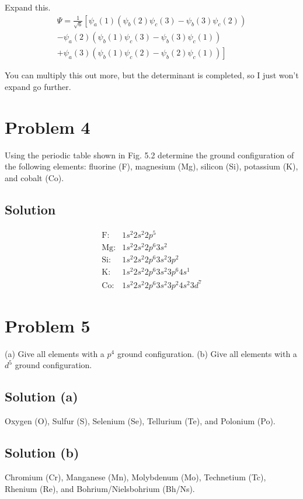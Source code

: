 \documentclass[12pt]{article}
\begin{document}
            Expand this.
            \begin{multline}
                \Psi    =   \frac{1}{\sqrt{6}} \left[ \psi_{a}(1)(\psi_{b}(2)\psi_{c}(3) - \psi_{b}(3)\psi_{c}(2))\right.\\
                        -   \psi_{a}(2) (\psi_{b}(1)\psi_{c}(3) - \psi_{b}(3)\psi_{c}(1))\\
                        +   \left.\psi_{a}(3)(\psi_{b}(1)\psi_{c}(2) - \psi_{b}(2)\psi_{c}(1))
                            \right]
            \end{multline}

            You can multiply this out more, but the determinant is completed, so I just won't expand go further.
    \pagebreak

    \section{Problem 4}
        Using the periodic table shown in Fig. 5.2 determine the ground configuration of the following elements: fluorine (F), magnesium (Mg), silicon (Si), potassium (K), and cobalt (Co).

        \subsection{Solution}
            \begin{align}
                \text{F}:&  1s^2 2s^2 2p^5\\
                \text{Mg}:& 1s^2 2s^2 2p^6 3s^2\\
                \text{Si}:& 1s^2 2s^2 2p^6 3s^2 3p^2\\
                \text{K}:&  1s^2 2s^2 2p^6 3s^2 3p^6 4s^1\\
                \text{Co}:& 1s^2 2s^2 2p^6 3s^2 3p^2 4s^2 3d^7
            \end{align}
        
    \section{Problem 5}
        (a) Give all elements with a $p^4$ ground configuration. 
        (b) Give all elements with a $d^5$ ground configuration.

        \subsection{Solution (a)}
            Oxygen (O), Sulfur (S), Selenium (Se), Tellurium (Te), and Polonium (Po).
        
        \subsection{Solution (b)}
            Chromium (Cr), Manganese (Mn), Molybdenum (Mo), Technetium (Tc), Rhenium (Re), and Bohrium/Nielsbohrium (Bh/Ns).
\end{document}
